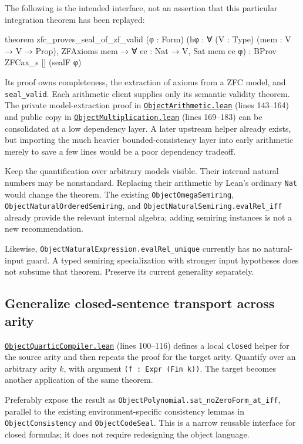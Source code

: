 \documentclass[11pt,letterpaper]{article}
\newcommand{\code}[1]{\nolinkurl{#1}}
\newcommand{\src}[2]{\href{https://github.com/VladimirReshetnikov/ProveIt/blob/60e9c5d620c6c387d932876cfa2d9376f64ea56c/Computability/DiophantineConsistency/Lean/DiophantineConsistency/#1.lean}{\nolinkurl{#1.lean}} (lines #2)}
\begin{document}
The following is the intended interface, not an assertion that this
particular integration theorem has been replayed:
\begin{Lean}
theorem zfc_proves_seal_of_zf_valid (φ : Form)
    (hφ : ∀ (V : Type) (mem : V → V → Prop),
      ZFAxioms mem → ∀ ee : Nat → V, Sat mem ee φ) :
    BProv ZFCax_s [] (sealF φ)
\end{Lean}

Its proof owns completeness, the extraction of axioms from a ZFC model,
and \code{seal_valid}. Each arithmetic client supplies only its
semantic validity theorem. The private model-extraction proof in
\src{ObjectArithmetic}{143--164} and public copy in
\src{ObjectMultiplication}{169--183} can be consolidated at a low
dependency layer. A later upstream helper already exists, but importing
the much heavier bounded-consistency layer into early arithmetic merely
to save a few lines would be a poor dependency tradeoff.

Keep the quantification over arbitrary models visible. Their internal
natural numbers may be nonstandard. Replacing their arithmetic by Lean's
ordinary \code{Nat} would change the theorem. The existing
\code{ObjectOmegaSemiring}, \code{ObjectNaturalOrderedSemiring}, and
\code{ObjectNaturalSemiring.evalRel_iff} already provide the relevant
internal algebra; adding semiring instances is not a new recommendation.

Likewise, \code{ObjectNaturalExpression.evalRel_unique} currently has
no natural-input guard. A typed semiring specialization with stronger
input hypotheses does not subsume that theorem. Preserve its current
generality separately.

\subsection{Generalize closed-sentence transport across arity}

\src{ObjectQuarticCompiler}{100--116} defines a local \code{closed}
helper for the source arity and then repeats the proof for the target
arity. Quantify over an arbitrary arity \(k\), with argument
\code{(f : Expr (Fin k))}.
The target becomes another application of the same theorem.

Preferably expose the result as
\code{ObjectPolynomial.sat_noZeroForm_at_iff}, parallel to the existing
environment-specific consistency lemmas in \code{ObjectConsistency}
and \code{ObjectCodeSeal}. This is a narrow reusable interface for
closed formulas; it does not require redesigning the object language.
\end{document}
